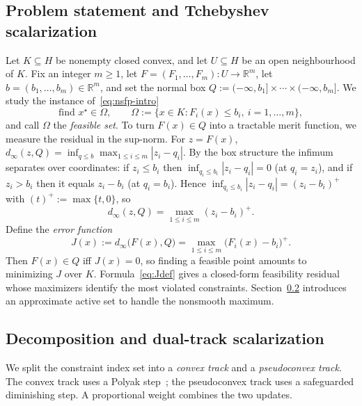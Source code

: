 \documentclass[]{interact}
\theoremstyle{plain}
\theoremstyle{definition}
\theoremstyle{remark}
\newcommand{\R}{\mathbb{R}}
\newcommand{\abs}[1]{\left\lvert #1 \right\rvert}
\begin{document}
\subsection{Problem statement and Tchebyshev scalarization}\label{ssec:model-stmt}
Let $K\subseteq H$ be nonempty closed convex, and let $U\subseteq H$ be an open
neighbourhood of $K$. Fix an integer $m\ge1$, let $F=(F_1,\dots,F_m):U\to\R^m$,
let $b=(b_1,\dots,b_m)\in\R^m$, and set the normal box
$Q:=(-\infty,b_1]\times\cdots\times(-\infty,b_m]$. We study the instance
of~\eqref{eq:nsfp-intro}
\begin{equation}\label{eq:nsfp-box}
\text{find } x^\star\in\Omega,\qquad
\Omega:=\bigl\{x\in K: F_i(x)\le b_i,\ i=1,\dots,m\bigr\},
\end{equation}
and call $\Omega$ the \emph{feasible set}. To turn $F(x)\in Q$ into a tractable merit
function, we measure the residual in the sup-norm. For $z=F(x)$,
$d_\infty(z,Q)=\inf_{q\le b}\max_{1\le i\le m}\abs{z_i-q_i}$. By the box structure the
infimum separates over coordinates: if $z_i\le b_i$ then
$\inf_{q_i\le b_i}\abs{z_i-q_i}=0$ (at $q_i=z_i$), and if $z_i>b_i$ then it equals
$z_i-b_i$ (at $q_i=b_i$). Hence $\inf_{q_i\le b_i}\abs{z_i-q_i}=(z_i-b_i)^+$ with
$(t)^+:=\max\{t,0\}$, so
\begin{equation}\label{eq:dinfty}
d_\infty(z,Q)=\max_{1\le i\le m}(z_i-b_i)^+ .
\end{equation}
Define the \emph{error function}
\begin{equation}\label{eq:Jdef}
J(x):=d_\infty\bigl(F(x),Q\bigr)=\max_{1\le i\le m}\bigl(F_i(x)-b_i\bigr)^+ .
\end{equation}
Then $F(x)\in Q$ iff $J(x)=0$, so finding a feasible point amounts to minimizing $J$
over $K$. Formula~\eqref{eq:Jdef} gives a closed-form feasibility residual whose
maximizers identify the most violated constraints. Section~\ref{ssec:dual-track}
introduces an approximate active set to handle the nonsmooth maximum.

\subsection{Decomposition and dual-track scalarization}\label{ssec:dual-track}
We split the constraint index set into a \emph{convex track} and a
\emph{pseudoconvex track}. The convex track uses a Polyak step~\citep{polyak1969};
the pseudoconvex track uses a safeguarded diminishing step.
A proportional weight combines the two updates.
\end{document}
